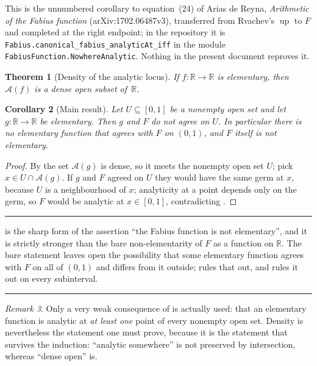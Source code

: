 \documentclass[11pt,oneside]{article}
\newtheorem{theorem}{Theorem}[section]
\newtheorem{corollary}[theorem]{Corollary}
\theoremstyle{definition}
\theoremstyle{remark}
\newtheorem{remark}[theorem]{Remark}
\newcommand{\R}{\mathbb R}
\newcommand{\Up}{\operatorname{up}}
\newcommand{\An}{\mathcal A}
\newenvironment{boxedremark}{%
  \par\smallskip\noindent\begin{center}\begin{minipage}{0.94\textwidth}%
  \color{black}\hrule\vspace{0.6em}\small
}{%
  \vspace{0.6em}\hrule\end{minipage}\end{center}\smallskip
}
\begin{document}
This is the unnumbered corollary to equation~(24) of Arias de Reyna,
\emph{Arithmetic of the Fabius function} (arXiv:1702.06487v3), transferred
from Rvachev's $\Up$ to $F$ and completed at the right endpoint; in the
repository it is \texttt{Fabius.canonical\_fabius\_analyticAt\_iff} in the
module \texttt{FabiusFunction.NowhereAnalytic}.  Nothing in the present
document reproves it.

\begin{theorem}[Density of the analytic locus]\label{thm:density}
If $f\colon\R\to\R$ is elementary, then $\An(f)$ is a dense open subset
of~$\R$.
\end{theorem}

\begin{corollary}[Main result]\label{cor:main}
Let $U\subseteq[0,1]$ be a nonempty open set and let $g\colon\R\to\R$ be
elementary.  Then $g$ and $F$ do not agree on $U$.  In particular there is no
elementary function that agrees with $F$ on $(0,1)$, and $F$ itself is not
elementary.
\end{corollary}

\begin{proof}
By  the set $\An(g)$ is dense, so it meets the nonempty open
set $U$; pick $x\in U\cap\An(g)$.  If $g$ and $F$ agreed on $U$ they would
have the same germ at $x$, because $U$ is a neighbourhood of $x$; analyticity
at a point depends only on the germ, so $F$ would be analytic at $x\in[0,1]$,
contradicting .
\end{proof}

\begin{boxedremark}
 is the sharp form of the assertion ``the Fabius function is
not elementary'', and it is strictly stronger than the bare
non-elementarity of $F$ as a function on $\R$.  The bare statement leaves
open the possibility that some elementary function agrees with $F$ on all of
$(0,1)$ and differs from it outside;  rules that out, and rules
it out on every subinterval.
\end{boxedremark}

\begin{remark}
Only a very weak consequence of  is actually used: that an
elementary function is analytic at \emph{at least one} point of every nonempty
open set.  Density is nevertheless the statement one must prove, because it is
the statement that survives the induction: ``analytic somewhere'' is not
preserved by intersection, whereas ``dense open'' is.
\end{remark}
\end{document}
